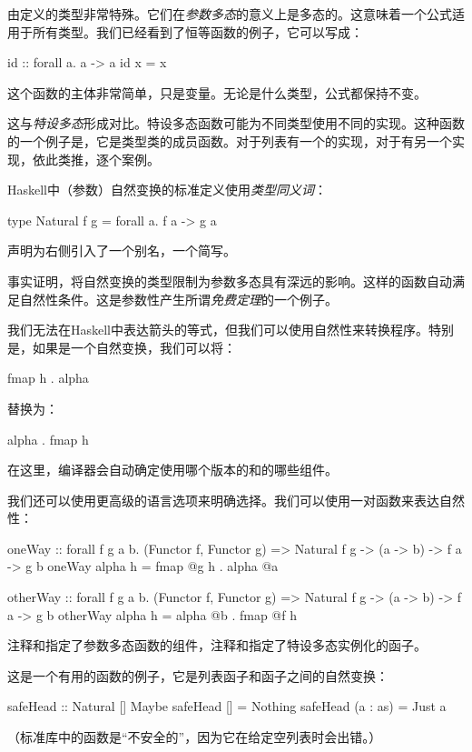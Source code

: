 \documentclass[DaoFP]{subfiles}
\begin{document}
由定义的类型非常特殊。它们在\emph{参数多态}的意义上是多态的。这意味着一个公式适用于所有类型。我们已经看到了恒等函数的例子，它可以写成：
\begin{haskell}
id :: forall a. a -> a
id x = x
\end{haskell}
这个函数的主体非常简单，只是变量。无论是什么类型，公式都保持不变。

这与\emph{特设多态}形成对比。特设多态函数可能为不同类型使用不同的实现。这种函数的一个例子是，它是类型类的成员函数。对于列表有一个的实现，对于有另一个实现，依此类推，逐个案例。

Haskell中（参数）自然变换的标准定义使用\emph{类型同义词}：
\begin{haskell}
type Natural f g = forall a. f a -> g a
\end{haskell}
声明为右侧引入了一个别名，一个简写。

事实证明，将自然变换的类型限制为参数多态具有深远的影响。这样的函数自动满足自然性条件。这是参数性产生所谓\emph{免费定理}的一个例子。

我们无法在Haskell中表达箭头的等式，但我们可以使用自然性来转换程序。特别是，如果是一个自然变换，我们可以将：
\begin{haskell}
fmap h . alpha
\end{haskell}
替换为：
\begin{haskell}
alpha . fmap h
\end{haskell}
在这里，编译器会自动确定使用哪个版本的和的哪些组件。

我们还可以使用更高级的语言选项来明确选择。我们可以使用一对函数来表达自然性：
\begin{haskell}
oneWay :: 
  forall f g a b. (Functor f, Functor g) => 
  Natural f g -> (a -> b) -> f a -> g b
oneWay alpha h = fmap @g h . alpha @a
\end{haskell}
\begin{haskell}
otherWay :: 
  forall f g a b. (Functor f, Functor g) => 
  Natural f g -> (a -> b) -> f a -> g b
otherWay alpha h = alpha @b . fmap @f h
\end{haskell}
注释和指定了参数多态函数的组件，注释和指定了特设多态实例化的函子。

这是一个有用的函数的例子，它是列表函子和函子之间的自然变换：
\begin{haskell}
safeHead :: Natural [] Maybe
safeHead [] = Nothing
safeHead (a : as) = Just a
\end{haskell}
（标准库中的函数是“不安全的”，因为它在给定空列表时会出错。）
\end{document}
